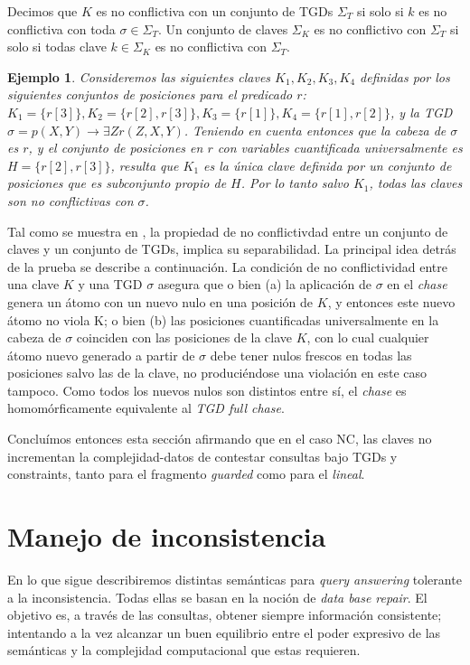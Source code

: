 \documentclass[11pt,a4paper,twoside]{tesis}
\newtheorem{exmp}{Ejemplo}
\begin{document}
Decimos que $K$ es no conflictiva con un conjunto de TGDs $\Sigma_T$ si solo si $k$ es no conflictiva con toda $\sigma \in \Sigma_T$. Un conjunto de claves $\Sigma_K$ es no conflictivo con $\Sigma_T$ si solo si todas clave $k \in \Sigma_K$ es no conflictiva con $\Sigma_T$.

\begin{exmp}
Consideremos las siguientes claves $K_1, K_2, K_3, K_4$ definidas por los siguientes conjuntos de posiciones para el predicado $r$: $K_1=\{r[3]\}, K_2=\{r[2], r[3]\}, K_3=\{r[1]\},  K_4=\{r[1], r[2]\}$, y la TGD $\sigma = p(X, Y) \rightarrow \exists Z r(Z, X, Y)$. Teniendo en cuenta entonces que la cabeza de $\sigma$ es $r$, y el conjunto de posiciones en $r$ con variables cuantificada universalmente es $H = \{r[2], r[3]\}$, resulta que $K_1$ es la única clave definida por un conjunto de posiciones que es subconjunto propio de $H$. Por lo tanto salvo $K_1$, todas las claves son no conflictivas con $\sigma$.
\end{exmp}

Tal como se muestra en \cite{JWS}, la propiedad de no conflictivdad entre un conjunto de claves y un conjunto de TGDs, implica su separabilidad. La principal idea detrás de la prueba se describe a continuación. La condición de no conflictividad entre una clave $K$ y una TGD $\sigma$ asegura que o bien (a) la aplicación de $\sigma$ en el \textit{chase} genera un átomo con un nuevo nulo en una posición de $K$, y entonces este nuevo átomo no viola K; o bien (b) las posiciones cuantificadas universalmente en la cabeza de $\sigma$ coinciden con las posiciones de la clave $K$, con lo cual cualquier átomo nuevo generado a partir de $\sigma$ debe tener nulos frescos en todas las posiciones salvo las de la clave, no produciéndose una violación en este caso tampoco. Como todos los nuevos nulos son distintos entre sí, el \textit{chase} es homomórficamente equivalente al \textit{TGD full chase}.

Concluímos entonces esta sección afirmando que en el caso NC, las claves no incrementan la complejidad-datos de contestar consultas bajo TGDs y constraints, tanto para el fragmento \textit{guarded} como para el \textit{lineal}.

\section{Manejo de inconsistencia}
En lo que sigue describiremos distintas semánticas para \textit{query answering} tolerante a la inconsistencia. Todas ellas se basan en la noción de \textit{data base repair}. El objetivo es, a través de las consultas, obtener siempre información consistente; intentando a la vez alcanzar un buen equilibrio entre el poder expresivo de las semánticas y la complejidad computacional que estas requieren. 
\end{document}

